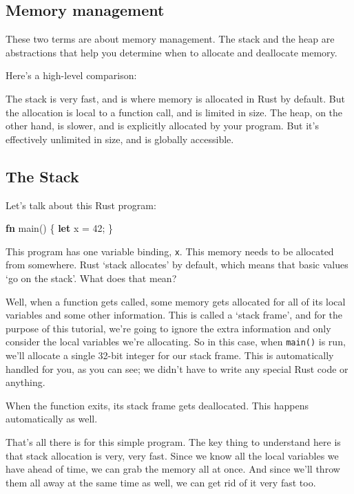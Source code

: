 \documentclass[a4paper,]{book}
\newenvironment{Shaded}{\begin{snugshade}}{\end{snugshade}}
\newcommand{\KeywordTok}[1]{\textcolor[rgb]{0.13,0.29,0.53}{\textbf{{#1}}}}
\newcommand{\DecValTok}[1]{\textcolor[rgb]{0.00,0.00,0.81}{{#1}}}
\newcommand{\NormalTok}[1]{{#1}}
\begin{document}
\subsection{Memory management}\label{memory-management}

These two terms are about memory management. The stack and the heap are
abstractions that help you determine when to allocate and deallocate
memory.

Here's a high-level comparison:

The stack is very fast, and is where memory is allocated in Rust by
default. But the allocation is local to a function call, and is limited
in size. The heap, on the other hand, is slower, and is explicitly
allocated by your program. But it's effectively unlimited in size, and
is globally accessible.

\hypertarget{the-stack}{\subsection{The Stack}\label{the-stack}}

Let's talk about this Rust program:

\begin{Shaded}
\begin{Highlighting}[]
\KeywordTok{fn} \NormalTok{main() \{}
    \KeywordTok{let} \NormalTok{x = }\DecValTok{42}\NormalTok{;}
\NormalTok{\}}
\end{Highlighting}
\end{Shaded}

This program has one variable binding, \texttt{x}. This memory needs to
be allocated from somewhere. Rust `stack allocates' by default, which
means that basic values `go on the stack'. What does that mean?

Well, when a function gets called, some memory gets allocated for all of
its local variables and some other information. This is called a `stack
frame', and for the purpose of this tutorial, we're going to ignore the
extra information and only consider the local variables we're
allocating. So in this case, when \texttt{main()} is run, we'll allocate
a single 32-bit integer for our stack frame. This is automatically
handled for you, as you can see; we didn't have to write any special
Rust code or anything.

When the function exits, its stack frame gets deallocated. This happens
automatically as well.

That's all there is for this simple program. The key thing to understand
here is that stack allocation is very, very fast. Since we know all the
local variables we have ahead of time, we can grab the memory all at
once. And since we'll throw them all away at the same time as well, we
can get rid of it very fast too.
\end{document}
